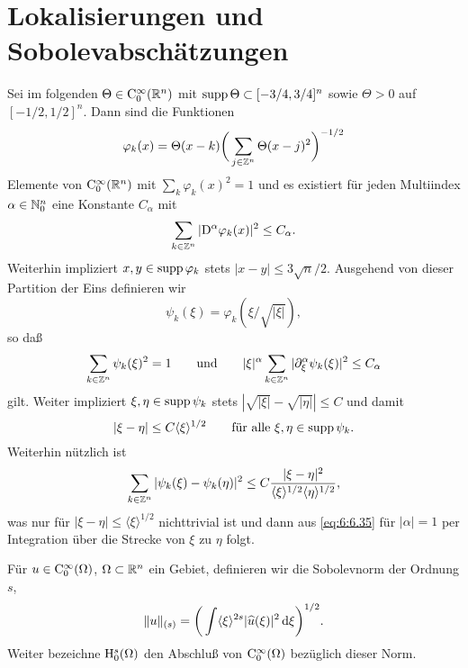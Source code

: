 \section{Lokalisierungen und Sobolevabschätzungen}
Sei im folgenden $\Theta\in\mathrm C_0^\infty(\mathbb R^n)$ mit $\operatorname{supp}\Theta\subset [-3/4,3/4]^n$ sowie $\Theta>0$ auf $[-1/2,1/2]^n$. Dann sind die Funktionen
\begin{equation}
\varphi_k(x) = \Theta(x-k) \bigg(\sum_{j\in\mathbb Z^n} \Theta(x-j)^2\bigg)^{-1/2}
\end{equation}
Elemente von $\mathrm C_0^\infty(\mathbb R^n)$ mit $\sum_{k} \varphi_k(x)^2=1$ und es existiert für jeden Multiindex $\alpha\in\mathbb N_0^n$ eine Konstante $C_\alpha$ mit
\begin{equation}
    \sum_{k\in\mathbb Z^n} | \mathrm D^\alpha \varphi_k(x)|^2 \le C_\alpha.
\end{equation}
Weiterhin impliziert $x,y\in\operatorname{supp}\varphi_k$ stets $|x-y|\le 3\sqrt n/2$. Ausgehend von dieser Partition der Eins definieren wir
\begin{equation}
    \psi_k(\xi)= \varphi_k(\xi / \sqrt{|\xi|}), 
\end{equation}
so daß
\begin{equation}\label{eq:6:6.35} 
    \sum_{k\in\mathbb Z^n} \psi_k(\xi)^2 = 1\qquad\text{und}\qquad |\xi|^\alpha \sum_{k\in\mathbb Z^n} |\partial_\xi^\alpha \psi_k(\xi)|^2 \le C_\alpha
\end{equation}
gilt. Weiter impliziert $\xi,\eta\in\operatorname{supp}\psi_k$ stets $|\sqrt{|\xi|}-\sqrt{|\eta|}|\le C$ und damit 
\begin{equation}
 |\xi-\eta|\le C \langle\xi\rangle^{1/2} \qquad\text{für alle $\xi,\eta\in\operatorname{supp}\psi_k$}.
\end{equation}
Weiterhin nützlich ist
\begin{equation}
  \sum_{k\in\mathbb Z^n} |\psi_k(\xi)-\psi_k(\eta)|^2 \le C \frac{|\xi-\eta|^2}{ \langle\xi\rangle^{1/2} \langle\eta\rangle^{1/2}},
\end{equation} 
was nur für $|\xi-\eta|\le \langle\xi\rangle^{1/2}$ nichttrivial ist und dann aus \eqref{eq:6:6.35} für $|\alpha|=1$ per Integration über die Strecke von $\xi$ zu $\eta$ folgt.

\begin{df}[Sobolevnormen]
Für $u\in\mathrm C_0^\infty(\Omega)$, $\Omega \subset\mathbb R^n$ ein Gebiet, definieren wir die Sobolevnorm der Ordnung $s$,
\begin{equation}
     \| u \|_{(s)} = \bigg(\int \langle\xi\rangle^{2s} |\widehat u(\xi)|^2\,\mathrm d\xi\bigg)^{1/2}. 
\end{equation}
Weiter bezeichne $\mathrm H^s_0(\Omega)$ den Abschluß von $\mathrm C_0^\infty(\Omega)$ bezüglich dieser Norm.
\end{df}


